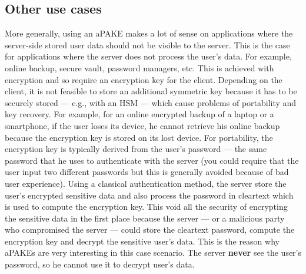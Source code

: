 ﻿\documentclass[../report.tex]{subfiles}
\begin{document}
\subsection{Other use cases}
More generally, using an aPAKE makes a lot of sense on applications where the server-side stored user data should not be visible to the server.  This is the case for applications where the server does not process the user's data. For example, online backup, secure vault, password managers, etc. This is achieved with encryption and so require an encryption key for the client.
Depending on the client, it is not feasible to store an additional symmetric key because it has to be securely stored --- e.g., with an HSM --- which cause problems of portability and key recovery. For example, for an online encrypted backup of a laptop or a smartphone, if the user loses its device, he cannot retrieve his online backup because the encryption key is stored on its lost device.
For portability, the encryption key is typically derived from the user's password --- the same password that he uses to authenticate with the server (you could require that the user input two different passwords but this is generally avoided because of bad user experience). Using a classical authentication method, the server store the user's encrypted sensitive data and also process the password in cleartext which is used to compute the encryption key. This void all the security of encrypting the sensitive data in the first place because the server --- or a malicious party who compromised the server --- could store the cleartext password, compute the encryption key and decrypt the sensitive user's data.
This is the reason why aPAKEs are very interesting in this case scenario. The server \textbf{never} see the user's password, so he cannot use it to decrypt user’s data.







\end{document}
